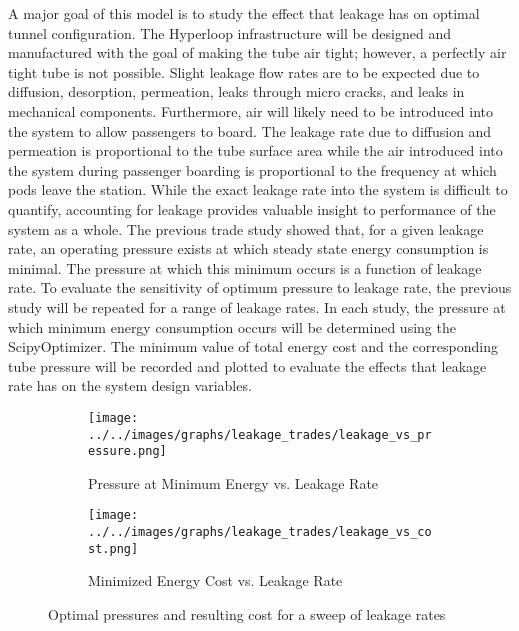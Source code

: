 A major goal of this model is to study the effect that leakage has on optimal
tunnel configuration. The Hyperloop infrastructure will be designed and
manufactured with the goal of making the tube air tight; however, a perfectly
air tight tube is not possible. Slight leakage flow rates are to be
expected due to diffusion, desorption, permeation, leaks through micro cracks,
and leaks in mechanical components. Furthermore, air will likely need to be
introduced into the system to allow passengers to board. The leakage rate due to
diffusion and permeation is proportional to the tube surface area while the air
introduced into the system during passenger boarding is proportional to the
frequency at which pods leave the station. While the exact leakage rate
into the system is difficult to quantify, accounting for leakage provides
valuable insight to performance of the system as a whole.
The previous trade study showed that, for a given leakage rate, an operating
pressure exists at which steady state energy consumption is minimal.
The pressure at which this minimum occurs is a function of leakage rate.
To evaluate the sensitivity of optimum pressure to leakage rate, the previous
study will be repeated for a range of leakage rates. In each study, the
pressure at which minimum energy consumption occurs will be determined using
the ScipyOptimizer. The minimum value of total energy cost and the
corresponding tube pressure will be recorded and plotted to evaluate the
effects that leakage rate has on the system design variables.

\begin{figure}
\centering
\begin{subfigure}{.5\textwidth}
  \centering
  \texttt{[image: ../../images/graphs/leakage\_trades/leakage\_vs\_pressure.png]}
  \caption{Pressure at Minimum Energy vs. Leakage Rate}
  \label{fig:leak_v_p}
\end{subfigure}%
\begin{subfigure}{.5\textwidth}
  \centering
  \texttt{[image: ../../images/graphs/leakage\_trades/leakage\_vs\_cost.png]}
  \caption{Minimized Energy Cost vs. Leakage Rate}
  \label{fig:leak_v_c}
\end{subfigure}
\caption{Optimal pressures and resulting cost for a sweep of leakage rates}
\label{fig:pres_vs_leakage_rate}
\end{figure}

